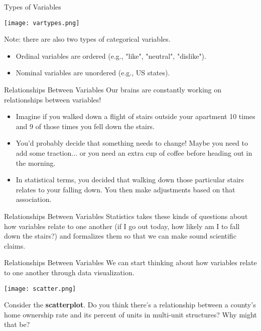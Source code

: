 \begin{frame}{Types of Variables}
    \begin{center}
        \texttt{[image: vartypes.png]}
    \end{center}
    Note: there are also two types of categorical variables.
    \begin{itemize}
        \item Ordinal variables are ordered (e.g., "like", "neutral", "dislike").
        \item Nominal variables are unordered (e.g., US states).
    \end{itemize}
\end{frame}

\begin{frame}{Relationships Between Variables}
    Our brains are constantly working on relationships between variables!
    \begin{itemize}
        \item Imagine if you walked down a flight of stairs outside your apartment 10 times and 9 of those times you fell down the stairs.
        \item You'd probably decide that something needs to change! Maybe you need to add some traction... or you need an extra cup of coffee before heading out in the morning. 
        \item In statistical terms, you decided that walking down those particular stairs relates to your falling down. You then make adjustments based on that association. 
    \end{itemize}
\end{frame}

\begin{frame}{Relationships Between Variables}
    Statistics takes these kinds of questions about how variables relate to one another (if I go out today, how likely am I to fall down the stairs?) and formalizes them so that we can make sound scientific claims.
\end{frame}

\begin{frame}{Relationships Between Variables}
    We can start thinking about how variables relate to one another through data visualization. 
    
    \begin{center}
        \texttt{[image: scatter.png]}
    \end{center}
    
    \vspace{-0.4cm}
    Consider the \textbf{scatterplot}. Do you think there's a relationship between a county's home ownership rate and its percent of units in multi-unit structures? Why might that be?
\end{frame}

